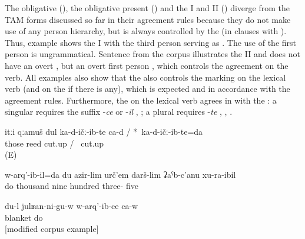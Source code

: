 The obligative (), the obligative present () and the  I and II () diverge from the TAM forms discussed so far in their agreement rules because they do not make use of any person hierarchy, but  is always controlled by the  (in clauses with ). Thus, example  shows the  I with the third person  serving as . The use of the first person  is ungrammatical. Sentence  from the corpus illustrates the  II and does not have an overt , but an overt first person , which controls the agreement on the verb. All examples also show that the  also controls the  marking on the lexical verb (and on the  if there is any), which is expected and in accordance with the  agreement rules. Furthermore, the  on the lexical verb agrees in  with the : a singular  requires the suffix -\textit{ce}  or -\textit{il} , ; a plural  requires -\textit{te} , , .


%
\begin{exe}
	\ex	\label{ex:I cut those reeds1}
	\gll	itːi	qːamuš		dul		ka-d-ičː-ib-te	ca-d	/	{*}~ka-d-ičː-ib-te=da\\
		those	reed			cut.up			/	{\hphantom{*}}~cut.up\\
	\glt	{} (E)
	
		\ex	\label{ex:‎‎‎I was born in 1935 analytic2}
	\gll	w-arq'-ib-il=da	du	azir-lim	urč'em	darš-lim	ʡaˁb-c'anu	xu-ra-ibil\\
		do		thousand	nine	hundred	three-	five\\
	\glt	{}
	
		\ex	\label{ex:‎I gave birth to (my son) under a blanket@A}
		\gll	du-l	julʁan-ni-gu-w	w-arq'-ib-ce	ca-w\\
				blanket	do 	\\
		\glt	{} [modified corpus example]

\end{exe}


